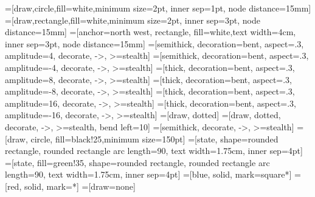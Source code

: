 \usepackage{pgf}
\usepackage{tikz}
\usetikzlibrary{decorations.pathmorphing} %
\usetikzlibrary{positioning}
\usetikzlibrary{er}
\usetikzlibrary{automata}
\usetikzlibrary{shapes.geometric}
\usetikzlibrary{shapes.misc}
=[draw,circle,fill=white,minimum size=2pt, inner sep=1pt, node distance=15mm]
=[draw,rectangle,fill=white,minimum size=2pt, inner sep=3pt, node distance=15mm]
=[anchor=north west, rectangle, fill=white,text width=4cm, inner sep=3pt, node distance=15mm]
=[semithick, decoration={bent, aspect=.3, amplitude=4}, decorate, ->, >=stealth]
=[semithick, decoration={bent, aspect=.3, amplitude=-4}, decorate, ->, >=stealth]
=[thick, decoration={bent, aspect=.3, amplitude=8}, decorate, ->, >=stealth]
=[thick, decoration={bent, aspect=.3, amplitude=-8}, decorate, ->, >=stealth]
=[thick, decoration={bent, aspect=.3, amplitude=16}, decorate, ->, >=stealth]
=[thick, decoration={bent, aspect=.3, amplitude=-16}, decorate, ->, >=stealth]
=[draw, dotted]
=[draw, dotted, decorate, ->, >=stealth, bend left=10]
=[semithick, decorate, ->, >=stealth]
=[draw, circle, fill=black!25,minimum size=150pt]
=[state, shape=rounded rectangle, rounded rectangle arc length=90, text width=1.75cm, inner sep=4pt]
=[state, fill=green!35, shape=rounded rectangle, rounded rectangle arc length=90, text width=1.75cm, inner sep=4pt]
=[blue, solid, mark=square*]
=[red, solid, mark=*]
=[draw=none]

